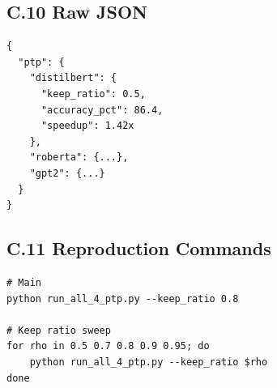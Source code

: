 \subsection{C.10 Raw JSON}

\begin{lstlisting}
{
  "ptp": {
    "distilbert": {
      "keep_ratio": 0.5,
      "accuracy_pct": 86.4,
      "speedup": 1.42x
    },
    "roberta": {...},
    "gpt2": {...}
  }
}
\end{lstlisting}

\subsection{C.11 Reproduction Commands}

\begin{lstlisting}
# Main
python run_all_4_ptp.py --keep_ratio 0.8

# Keep ratio sweep
for rho in 0.5 0.7 0.8 0.9 0.95; do
    python run_all_4_ptp.py --keep_ratio $rho
done
\end{lstlisting}

